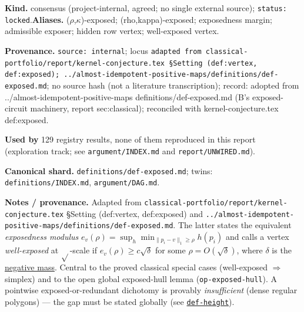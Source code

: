 \begin{defnote}
\textbf{Kind.} consensus (project-internal, agreed; no single external source); \texttt{status: locked}.\quad\textbf{Aliases.} ($\rho$,$\kappa$)-exposed; (rho,kappa)-exposed; exposedness margin; admissible exposer; hidden row vertex; well-exposed vertex.
\par
\textbf{Provenance.} \texttt{source: internal}; locus \texttt{adapted from classical-\allowbreak{}portfolio/\allowbreak{}report/\allowbreak{}kernel-\allowbreak{}conjecture.\allowbreak{}tex \S{}Setting (def:\allowbreak{}vertex,\allowbreak{} def:\allowbreak{}exposed);\allowbreak{} ..\allowbreak{}/\allowbreak{}almost-\allowbreak{}idempotent-\allowbreak{}positive-\allowbreak{}maps/\allowbreak{}definitions/\allowbreak{}def-\allowbreak{}exposed.\allowbreak{}md}; no source hash (not a literature transcription); record: adopted from ..\allowbreak{}/\allowbreak{}almost-\allowbreak{}idempotent-\allowbreak{}positive-\allowbreak{}maps definitions/\allowbreak{}def-\allowbreak{}exposed.\allowbreak{}md (B's exposed-\allowbreak{}circuit machinery,\allowbreak{} report sec:\allowbreak{}classical);\allowbreak{} reconciled with kernel-\allowbreak{}conjecture.\allowbreak{}tex def:\allowbreak{}exposed.
\par
\textbf{Used by} 129 registry results, none of them reproduced in this report (exploration track; see \texttt{argument/INDEX.md} and \texttt{report/UNWIRED.md}).
\par
\textbf{Canonical shard.} \texttt{definitions/\allowbreak{}def-\allowbreak{}exposed.\allowbreak{}md}; twins: \texttt{definitions/INDEX.md}, \texttt{argument/DAG.md}.
\par
\textbf{Notes / provenance.} Adapted from \texttt{classical-\allowbreak{}portfolio/\allowbreak{}report/\allowbreak{}kernel-\allowbreak{}conjecture.\allowbreak{}tex} \S{}Setting
(def:vertex, def:exposed) and \texttt{..\allowbreak{}/\allowbreak{}almost-\allowbreak{}idempotent-\allowbreak{}positive-\allowbreak{}maps/\allowbreak{}definitions/\allowbreak{}def-\allowbreak{}exposed.\allowbreak{}md}. The latter
states the equivalent \emph{exposedness modulus} $e_v(\rho)=\sup_h\min_{\lVert p_i-v\rVert_1\ge\rho}h(p_i)$ and
calls a vertex \emph{well-exposed} at $\sqrt{}$-scale if $e_v(\rho)\ge c\sqrt\delta$ for some
$\rho=O(\sqrt\delta)$, where $\delta$ is the \hyperref[def:negative-mass]{negative mass}. Central to the proved
classical special cases (well-exposed $\Rightarrow$ simplex) and to the open global exposed-hull lemma
(\texttt{op-\allowbreak{}exposed-\allowbreak{}hull}). A pointwise exposed-or-redundant dichotomy is provably \emph{insufficient} (dense regular
polygons) --- the gap must be stated globally (see \hyperref[def:height]{\texttt{def-\allowbreak{}height}}).
\end{defnote}

